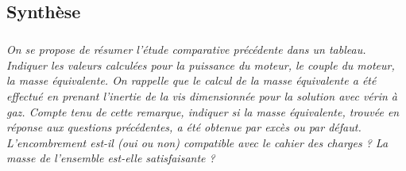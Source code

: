 \begin{multicols}{2}
\subsection*{Synthèse}

\subparagraph{}\textit{On se propose de résumer l’étude comparative précédente dans un tableau. Indiquer les valeurs calculées pour la puissance du moteur, le couple du moteur, la masse équivalente. On rappelle que
le calcul de la masse équivalente a été effectué en prenant l’inertie de la vis
dimensionnée pour la solution avec vérin à gaz. Compte tenu de cette remarque,
indiquer si la masse équivalente, trouvée en réponse aux questions précédentes,
a été obtenue par excès ou par défaut. L’encombrement est-il (oui ou non) compatible
avec le cahier des charges ? La masse de l’ensemble est-elle
satisfaisante ?}
\ifprof
\begin{corrige}~\\
\end{corrige}
\else
\fi

%
%
%


\end{multicols}
